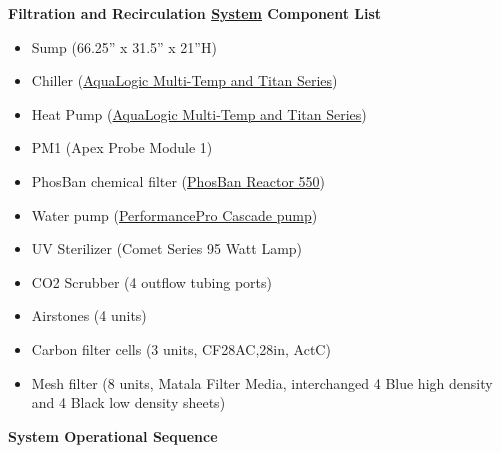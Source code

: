 \documentclass[]{book}
\providecommand{\tightlist}{%
  \setlength{\itemsep}{0pt}\setlength{\parskip}{0pt}}
\begin{document}
 \textbf{Filtration and Recirculation
\href{/Manuals/Filtration_Skid_Build_Package.pdf}{System} Component
List}

\begin{itemize}
\tightlist
\item
  Sump (66.25'' x 31.5'' x 21''H)\\
\item
  Chiller (\href{/Manuals/AquaLogic_Chiller.pdf}{AquaLogic Multi-Temp
  and Titan Series})\\
\item
  Heat Pump (\href{/Manuals/AquaLogic_Chiller.pdf}{AquaLogic Multi-Temp
  and Titan Series})\\
\item
  PM1 (Apex Probe Module 1)\\
\item
  PhosBan chemical filter (\href{/Manuals/Phosban_Reactor.pdf}{PhosBan
  Reactor 550})\\
\item
  Water pump (\href{/Manuals/Complete_Cascade.pdf}{PerformancePro
  Cascade pump})\\
\item
  UV Sterilizer (Comet Series 95 Watt Lamp)\\
\item
  CO2 Scrubber (4 outflow tubing ports)
\item
  Airstones (4 units)\\
\item
  Carbon filter cells (3 units, CF28AC,28in, ActC)\\
\item
  Mesh filter (8 units, Matala Filter Media, interchanged 4 Blue high
  density and 4 Black low density sheets)
\end{itemize}

 \textbf{System Operational Sequence}
\end{document}
